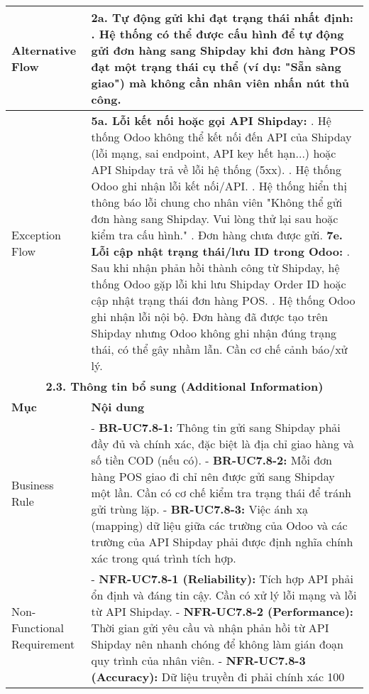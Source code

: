 \begin{longtable}{|m{4cm}|p{11cm}|}
\hline
Alternative Flow & \textbf{2a. Tự động gửi khi đạt trạng thái nhất định:} \newline    1. Hệ thống có thể được cấu hình để tự động gửi đơn hàng sang Shipday khi đơn hàng POS đạt một trạng thái cụ thể (ví dụ: "Sẵn sàng giao") mà không cần nhân viên nhấn nút thủ công. \\
\hline
Exception Flow & \textbf{5a. Lỗi kết nối hoặc gọi API Shipday:} \newline    1. Hệ thống Odoo không thể kết nối đến API của Shipday (lỗi mạng, sai endpoint, API key hết hạn...) hoặc API Shipday trả về lỗi hệ thống (5xx). \newline    2. Hệ thống Odoo ghi nhận lỗi kết nối/API. \newline    3. Hệ thống hiển thị thông báo lỗi chung cho nhân viên "Không thể gửi đơn hàng sang Shipday. Vui lòng thử lại sau hoặc kiểm tra cấu hình." \newline    4. Đơn hàng chưa được gửi. \newline \textbf{7e. Lỗi cập nhật trạng thái/lưu ID trong Odoo:} \newline    1. Sau khi nhận phản hồi thành công từ Shipday, hệ thống Odoo gặp lỗi khi lưu Shipday Order ID hoặc cập nhật trạng thái đơn hàng POS. \newline    2. Hệ thống Odoo ghi nhận lỗi nội bộ. Đơn hàng đã được tạo trên Shipday nhưng Odoo không ghi nhận đúng trạng thái, có thể gây nhầm lẫn. Cần cơ chế cảnh báo/xử lý. \\
\hline
\multicolumn{2}{|c|}{\textbf{2.3. Thông tin bổ sung (Additional Information)}} \\
\hline
\textbf{Mục} & \textbf{Nội dung} \\
\hline
Business Rule & - \textbf{BR-UC7.8-1:} Thông tin gửi sang Shipday phải đầy đủ và chính xác, đặc biệt là địa chỉ giao hàng và số tiền COD (nếu có). \newline - \textbf{BR-UC7.8-2:} Mỗi đơn hàng POS giao đi chỉ nên được gửi sang Shipday một lần. Cần có cơ chế kiểm tra trạng thái để tránh gửi trùng lặp. \newline - \textbf{BR-UC7.8-3:} Việc ánh xạ (mapping) dữ liệu giữa các trường của Odoo và các trường của API Shipday phải được định nghĩa chính xác trong quá trình tích hợp. \\
\hline
Non-Functional Requirement & - \textbf{NFR-UC7.8-1 (Reliability):} Tích hợp API phải ổn định và đáng tin cậy. Cần có xử lý lỗi mạng và lỗi từ API Shipday. \newline - \textbf{NFR-UC7.8-2 (Performance):} Thời gian gửi yêu cầu và nhận phản hồi từ API Shipday nên nhanh chóng để không làm gián đoạn quy trình của nhân viên. \newline - \textbf{NFR-UC7.8-3 (Accuracy):} Dữ liệu truyền đi phải chính xác 100%
\hline
\end{longtable}


